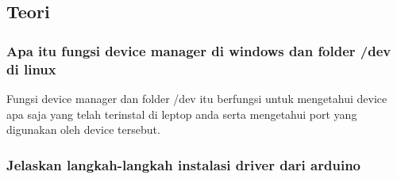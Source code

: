 \subsection{Teori}
\subsubsection{Apa itu fungsi device manager di windows dan folder /dev di linux}
Fungsi device manager dan folder /dev itu berfungsi untuk mengetahui device apa saja yang telah terinstal di leptop anda serta mengetahui port yang digunakan oleh device tersebut.

\subsubsection{Jelaskan langkah-langkah instalasi driver dari arduino}
